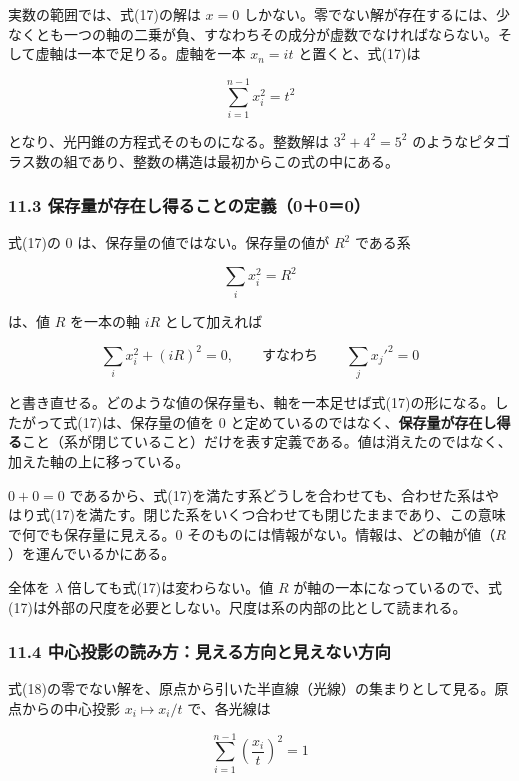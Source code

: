 \documentclass[
  a4paper,
]{ltjsarticle}
\begin{document}
実数の範囲では、式(17)の解は \(x=0\)
しかない。零でない解が存在するには、少なくとも一つの軸の二乗が負、すなわちその成分が虚数でなければならない。そして虚軸は一本で足りる。虚軸を一本
\(x_n=it\) と置くと、式(17)は

\[
\sum_{i=1}^{n-1}x_i^2=t^2
\tag{18}
\]

となり、光円錐の方程式そのものになる。整数解は \(3^2+4^2=5^2\)
のようなピタゴラス数の組であり、整数の構造は最初からこの式の中にある。

\subsubsection{11.3
保存量が存在し得ることの定義（0＋0＝0）}\label{ux4fddux5b58ux91cfux304cux5b58ux5728ux3057ux5f97ux308bux3053ux3068ux306eux5b9aux7fa9000}

式(17)の 0 は、保存量の値ではない。保存量の値が \(R^2\) である系

\[
\sum_i x_i^2=R^2
\]

は、値 \(R\) を一本の軸 \(iR\) として加えれば

\[
\sum_i x_i^2+(iR)^2=0,\qquad\text{すなわち}\qquad \sum_j x_j'^2=0
\tag{18a}
\]

と書き直せる。どのような値の保存量も、軸を一本足せば式(17)の形になる。したがって式(17)は、保存量の値を
0
と定めているのではなく、\textbf{保存量が存在し得る}こと（系が閉じていること）だけを表す定義である。値は消えたのではなく、加えた軸の上に移っている。

\(0+0=0\)
であるから、式(17)を満たす系どうしを合わせても、合わせた系はやはり式(17)を満たす。閉じた系をいくつ合わせても閉じたままであり、この意味で何でも保存量に見える。0
そのものには情報がない。情報は、どの軸が値（\(R\)）を運んでいるかにある。

全体を \(\lambda\) 倍しても式(17)は変わらない。値 \(R\)
が軸の一本になっているので、式(17)は外部の尺度を必要としない。尺度は系の内部の比として読まれる。

\subsubsection{11.4
中心投影の読み方：見える方向と見えない方向}\label{ux4e2dux5fc3ux6295ux5f71ux306eux8aadux307fux65b9ux898bux3048ux308bux65b9ux5411ux3068ux898bux3048ux306aux3044ux65b9ux5411}

式(18)の零でない解を、原点から引いた半直線（光線）の集まりとして見る。原点からの中心投影
\(x_i\mapsto x_i/t\) で、各光線は

\[
\sum_{i=1}^{n-1}\left(\frac{x_i}{t}\right)^2=1
\]
\end{document}
